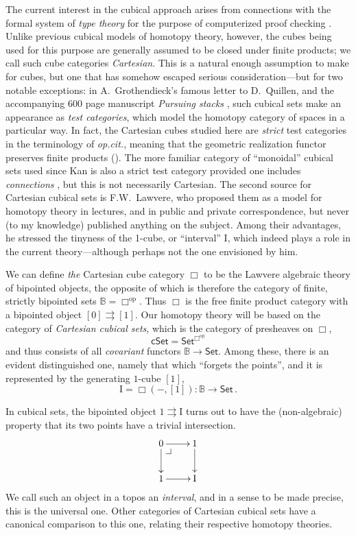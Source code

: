 \documentclass[11pt,reqno]{amsart}
\makeatletter
\newcommand{\opcit}{\emph{op.cit.}}
\newcommand{\B}{\ensuremath{\mathbb{B}}}
\newcommand{\psh}[1]{\ensuremath{\mathsf{Set}^{#1^{\mathrm{op}}}}}
\newcommand{\Set}{\ensuremath{\mathsf{Set}}}
\newcommand{\cSet}{\ensuremath{\mathsf{cSet}}}
\newcommand{\op}[1]{\ensuremath{{#1}^{\mathrm{op}}}}
\renewcommand{\to}{\ensuremath{\rightarrow}}
\newcommand{\too}{\ensuremath{\longrightarrow}}
\newcommand{\I}{\ensuremath{\mathrm{I}}}
\theoremstyle{remark}
\theoremstyle{definition}
\newcommand{\pbcorner}[1][dr]{\save*!/#1-1.2pc/#1:(-1,1)@^{|-}\restore}
\makeatother
\begin{document}
The current interest in the cubical approach arises from connections with the  formal system of \emph{type theory} for the purpose of computerized proof checking \cite{AwodeyCoquand:2013}.  Unlike previous cubical models of homotopy theory, however, the cubes being used for this purpose are generally assumed to be closed under finite products; we call such cube categories \emph{Cartesian}.  This is a natural enough assumption to make for cubes, but one that has somehow escaped serious consideration---but for two notable exceptions: in A.~Grothendieck's famous letter to D.~Quillen, and the accompanying 600 page manuscript \emph{Pursuing stacks} \cite{G:1983}, such cubical sets make an appearance as \emph{test categories}, which model the homotopy category of spaces in a particular way.  In fact, the Cartesian cubes studied here are \emph{strict} test categories in the terminology of \opcit, meaning that the geometric realization functor preserves finite products (\cite{BuchholtzMoorehouse}).  The more familiar category of ``monoidal'' cubical sets used since Kan is also a strict test category provided one includes \emph{connections} \cite{Maltsiniotis:2009}, but this is not necessarily Cartesian.  The second source for Cartesian cubical sets is F.W.~Lawvere, who proposed them as a model for homotopy theory in lectures, and in public and private correspondence, but never (to my knowledge) published anything on the subject.   Among their advantages, he stressed the tinyness of the 1-cube, or ``interval'' $\I$, which indeed plays a role in the current theory---although perhaps not the one envisioned by him.

We can define \emph{the} Cartesian cube category $\Box$ to be the Lawvere algebraic theory of bipointed objects, the opposite of which is therefore the category of finite, strictly bipointed sets $\B = \op\Box$.  Thus $\Box$ is the free finite product category with a bipointed object $[0]\rightrightarrows [1]$.  Our homotopy theory will be based on the category of \emph{Cartesian cubical sets}, which is the category of presheaves on $\Box$,
\[
\cSet = \psh{\Box}
\]
and thus consists of all \emph{covariant} functors $\B\to\Set$. Among these, there is an evident distinguished one, namely that which ``forgets the points'', and it is represented by the generating $1$-cube $[1]$,
\[
\I = \Box(-,[1]) : \B \too\Set\,.
\]

In cubical sets, the bipointed object $1\rightrightarrows\I$ turns out to have the (non-algebraic) property that its two points have a trivial intersection.  
\[
\xymatrix{
0 \ar[d] \ar[r] \pbcorner & 1 \ar[d]  \\
1 \ar[r] & \I
}
\]
We call such an object in a topos an \emph{interval}, and in a sense to be made precise, this is the universal one.  Other categories of Cartesian cubical sets have a canonical comparison to this one, relating their respective homotopy theories.
\end{document}
